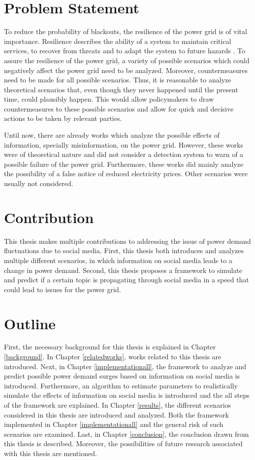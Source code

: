 \section{Problem Statement}
\label{problemstatement}

To reduce the probability of blackouts, 
the resilience of the power grid is of vital importance.
Resilience describes the ability of a system 
to maintain critical services, to recover from threats
and to adapt the system to future hazards 
\cite{wells2022modeling}.
To assure the resilience of the power grid, a variety of possible 
scenarios which could negatively affect the power grid need
to be analyzed. Moreover, countermeasures need to be made for all possible scenarios.
Thus, it is reasonable to analyze theoretical scenarios that, even though
they never happened until the present time, could plausibly happen. This 
would allow policymakers to draw countermeasures to these possible scenarios
and allow for quick and decisive actions to be taken by relevant 
parties.

Until now, there are already works which analyze the possible effects
of information, specially misinformation, on the power
grid. However, these works were of theoretical nature and
did not consider a detection system to warn of a possible 
failure of the power grid. Furthermore, these works did mainly analyze the 
possibility of a false notice of reduced electricity prices.
Other scenarios were usually not considered.

\section{Contribution}
\label{contribution}
This thesis makes multiple contributions to addressing the issue of 
power demand fluctuations due to social media.
First, this thesis both introduces and 
analyzes multiple different scenarios, in which
information on social media leads to a change in power demand.
Second, this thesis proposes a framework to simulate and predict if 
a certain topic is propagating through social media
in a speed that could lead to issues for the power grid.

\section{Outline}
\label{outline}

First, the necessary background for this thesis is explained
in Chapter \ref{background}. 
In Chapter \ref{relatedworks}, works related to 
this thesis are introduced.
Next, in Chapter \ref{implementationall}, the framework to
analyze and predict possible power demand surges based on
information on social media is introduced. Furthermore,
an algorithm to estimate parameters to realistically simulate
the effects of information on social media is introduced and 
the all steps of the framework are explained.
In Chapter \ref{results}, the different scenarios 
considered in this thesis are introduced and analyzed. Both the 
framework implemented in Chapter \ref{implementationall}
and the general risk of such scenarios are 
examined.
Last, in Chapter \ref{conclusion}, the conclusion drawn 
from this thesis is described. Moreover, the possibilities
of future research associated with this thesis 
are mentioned.